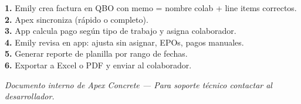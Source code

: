 \documentclass[11pt,a4paper]{article}
\begin{document}
\begin{center}
\begin{tcolorbox}[colback=apexlight,colframe=apexorange,boxrule=1pt,arc=4pt]
\textbf{1.} Emily crea factura en QBO con memo = nombre colab + line items correctos. \\[0.4em]
\textbf{2.} Apex sincroniza (rápido o completo). \\[0.4em]
\textbf{3.} App calcula pago según tipo de trabajo y asigna colaborador. \\[0.4em]
\textbf{4.} Emily revisa en app: ajusta sin asignar, EPOs, pagos manuales. \\[0.4em]
\textbf{5.} Generar reporte de planilla por rango de fechas. \\[0.4em]
\textbf{6.} Exportar a Excel o PDF y enviar al colaborador.
\end{tcolorbox}
\end{center}

\vfill

\begin{center}
\textcolor{apexgray}{\small \textit{Documento interno de Apex Concrete --- Para soporte técnico contactar al desarrollador.}}
\end{center}
\end{document}
